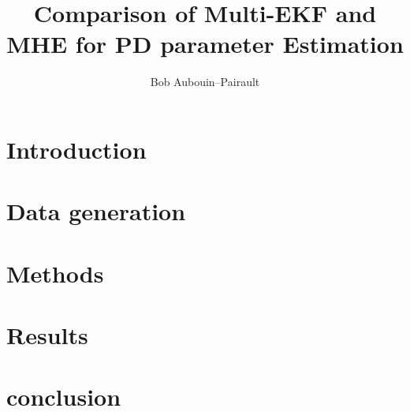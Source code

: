 \documentclass[a4paper,12pt]{article}
\begin{document}
\title{Comparison of Multi-EKF and MHE for PD parameter Estimation}

\author{Bob Aubouin--Pairault}
\maketitle

\section{Introduction}


\section{Data generation}




\section{Methods}


\section{Results}


\section{conclusion}



\end{document}
